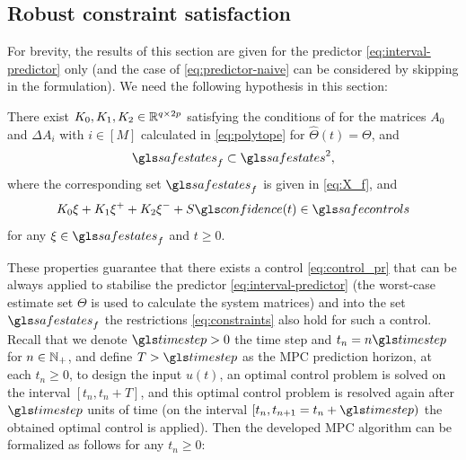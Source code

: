 \subsection{Robust constraint satisfaction}
\label{sec:stab-robust-control}

For brevity, the results of this section are given for the predictor
\eqref{eq:interval-predictor} only (and the case of \eqref{eq:predictor-naive}
can be considered by skipping  in the
formulation). We need the following hypothesis in this section:
\begin{assumption}
	\begin{leftbar}[assumptionbar]
	\label{assumpt:feasible-constr} There exist $K_{0},K_{1},K_{2}\in\mathbb{R}^{q\times2p}$	satisfying the conditions of  for the matrices	$A_{0}$ and $\Delta A_{i}$ with $i\in[M]$ calculated in \eqref{eq:polytope}	for $\hat{\Theta}(t)=\Theta$, and
	\[
	\safestates_{f}\subset\safestates^{2},
	\]
	where the corresponding set $\safestates_{f}$ is given in \eqref{eq:X_f}, and
	\[
	K_{0}\xi+K_{1}\xi^{+}+K_{2}\xi^{-}+S\confidence(t)\in\safecontrols
	\]
	for any $\xi\in\safestates_{f}$ and $t\geq0$.
	\end{leftbar}
\end{assumption}
These properties guarantee that there exists a control \eqref{eq:control_pr}
that can be always applied to stabilise the predictor \eqref{eq:interval-predictor}
(the worst-case estimate set $\Theta$ is used to calculate the system
matrices) and into the set $\safestates_{f}$ the restrictions \eqref{eq:constraints}
also hold for such a control. Recall that we denote $\timestep>0$ the time step and $t_{n}=n\timestep$ for $n\in\mathbb{N}_{+}$, and define $T>\timestep $ as the \gls{MPC} prediction horizon, \ie at each $t_n\geq0$, to design
the input $u(t)$, an optimal control problem is solved on the interval $[t_n,t_n+T]$, and this optimal control problem is resolved again after $\timestep$ units of time (on the interval $[t_n,t_{n+1} = t_n+\timestep)$ the obtained
optimal control is applied). Then the developed \gls{MPC} algorithm can be formalized as follows for
any $t_{n}\geq0$:
